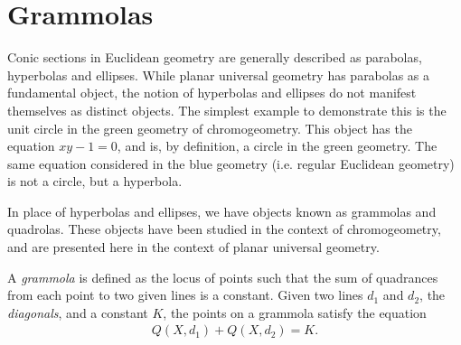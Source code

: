\section{Grammolas}

Conic sections in Euclidean geometry are generally described as parabolas, hyperbolas and ellipses.
While planar universal geometry has parabolas as a fundamental object, the notion of hyperbolas and ellipses do not manifest themselves as distinct objects.
The simplest example to demonstrate this is the unit circle in the green geometry of chromogeometry.
This object has the equation $xy - 1 = 0$, and is, by definition, a circle in the green geometry.
The same equation considered in the blue geometry (i.e. regular Euclidean geometry) is not a circle, but a hyperbola.

In place of hyperbolas and ellipses, we have objects known as grammolas and quadrolas.
These objects have been studied in the context of chromogeometry\cite{wildberger:rel-conics}, and are presented here in the context of planar universal geometry.

\begin{definition} A \emph{grammola} is defined as the locus of points such that the sum of quadrances from each point to two given lines is a constant. Given two lines $d_1$ and $d_2$, the \emph{diagonals}, and a constant $K$, the points on a grammola satisfy the equation
\begin{eqnarray}
Q(X, d_1) + Q(X, d_2) = K.
\end{eqnarray}
\end{definition}

